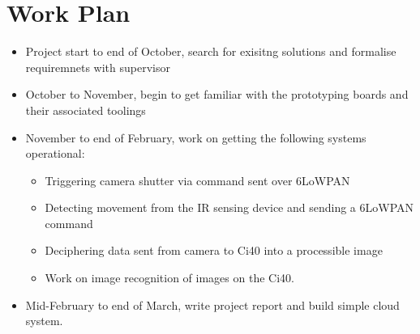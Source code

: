 \documentclass{article}
\begin{document}
\section*{Work Plan}
\begin{itemize}
    \item Project start to end of October, search for exisitng solutions and
        formalise requiremnets with supervisor
    \item October to November, begin to get familiar with the prototyping boards
        and their associated toolings
    \item November to end of February, work on getting the following systems
        operational:
        \begin{itemize}
            \item Triggering camera shutter via command sent over 6LoWPAN
            \item Detecting movement from the IR sensing device and sending a
                6LoWPAN command
            \item Deciphering data sent from camera to Ci40 into a processible
                image
            \item Work on image recognition of images on the Ci40.
        \end{itemize}
    \item Mid-February to end of March, write project report and build simple
        cloud system.
\end{itemize}
\end{document}
